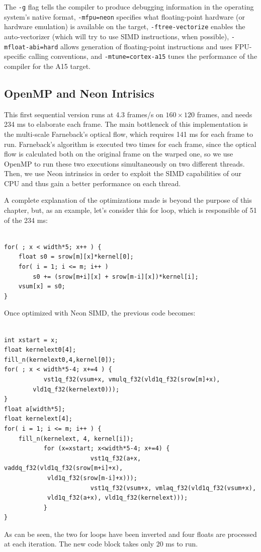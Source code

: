 The \verb+-g+ flag tells the compiler to produce debugging information in the operating system's native format, \verb+-mfpu=neon+  specifies what floating-point hardware (or hardware emulation) is available on the target, \verb+-ftree-vectorize+ enables the auto-vectorizer (which will try to use SIMD instructions, when possible), \verb+-mfloat-abi=hard+ allows generation of floating-point instructions and uses FPU-specific calling conventions, and \verb+-mtune=cortex-a15+ tunes the performance of the compiler for the A15 target.

\subsection{OpenMP and Neon Intrisics}
This first sequential version runs at 4.3 frames/s on $160\times 120$ frames, and needs 234 ms to elaborate each frame. The main bottleneck of this implementation is the multi-scale Farneback's optical flow, which requires 141 ms for each frame to run. Farneback's algorithm is executed two times for each frame, since the optical flow is calculated both on the original frame on the warped one, so we use OpenMP to run these two executions simultaneously on two different threads. Then, we use Neon intrinsics in order to exploit the SIMD capabilities of our CPU and thus gain a better performance on each thread.

A complete explanation of the optimizations made is beyond the purpose of this chapter, but, as an example, let's consider this for loop, which is responsible of 51 of the 234 ms:
\begin{lstlisting}[frame=single]  % Start your code-block

for( ; x < width*5; x++ ) {
	float s0 = srow[m][x]*kernel[0];
	for( i = 1; i <= m; i++ )
		s0 += (srow[m+i][x] + srow[m-i][x])*kernel[i];
	vsum[x] = s0;
}
\end{lstlisting}

Once optimized with Neon SIMD, the previous code becomes:
\begin{lstlisting}[frame=single]  % Start your code-block

int xstart = x;
float kernelext0[4];
fill_n(kernelext0,4,kernel[0]);
for( ; x < width*5-4; x+=4 ) {
           vst1q_f32(vsum+x, vmulq_f32(vld1q_f32(srow[m]+x),
		vld1q_f32(kernelext0)));
}
float a[width*5];
float kernelext[4];
for( i = 1; i <= m; i++ ) {
	fill_n(kernelext, 4, kernel[i]);
           for (x=xstart; x<width*5-4; x+=4) {
                        vst1q_f32(a+x, vaddq_f32(vld1q_f32(srow[m+i]+x), 
			vld1q_f32(srow[m-i]+x)));
                        vst1q_f32(vsum+x, vmlaq_f32(vld1q_f32(vsum+x), 
			vld1q_f32(a+x), vld1q_f32(kernelext)));
           }
}
\end{lstlisting}
As can be seen, the two for loops have been inverted and four floats are processed at each iteration. The new code block takes only 20 ms to run. 

